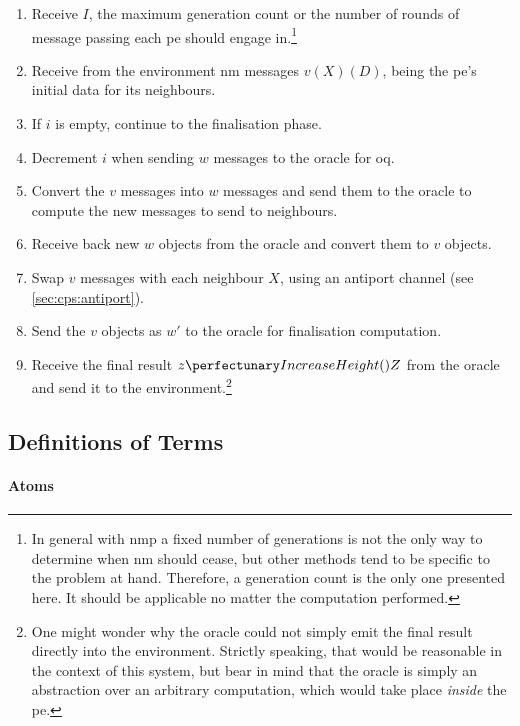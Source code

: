 \begin{enumerate}
    \item Receive \(I\), the maximum generation count or the number of rounds of message passing each \gls{pe} should engage in.\footnote{In general with \gls{nmp} a fixed number of generations is not the only way to determine when \gls{nm} should cease, but other methods tend to be specific to the problem at hand.   Therefore, a generation count is the only one presented here.  It should be applicable no matter the computation performed.}
    \item Receive from the environment \gls{nm} messages \(v(X)(D)\), being the \gls{pe}'s initial data for its neighbours.
    \item If \(i\) is empty, continue to the finalisation phase.
    \item Decrement \(i\) when sending \(w\) messages to the oracle for \gls{oq}.
    \item Convert the \(v\) messages into \(w\) messages and send them to the oracle to compute the new messages to send to neighbours.
    \item Receive back new \(w\) objects from the oracle and convert them to \(v\) objects.
    \item Swap \(v\) messages with each neighbour \(X\), using an antiport channel (see \cref{sec:cps:antiport}).
    \item Send the \(v\) objects as \(w'\) to the oracle for finalisation computation.
    \item Receive the final result \(\cpfunc{z}{Z}\) from the oracle and send it to the environment.\footnote{One might wonder why the oracle could not simply emit the final result directly into the environment.  Strictly speaking, that would be reasonable in the context of this system, but bear in mind that the oracle is simply an abstraction over an arbitrary computation, which would take place \emph{inside} the \gls{pe}.}
\end{enumerate}

\subsection{\label{sec:nmp:systemwide:definitions}Definitions of Terms}

\paragraph{Atoms}
\begin{description}
\end{description}

